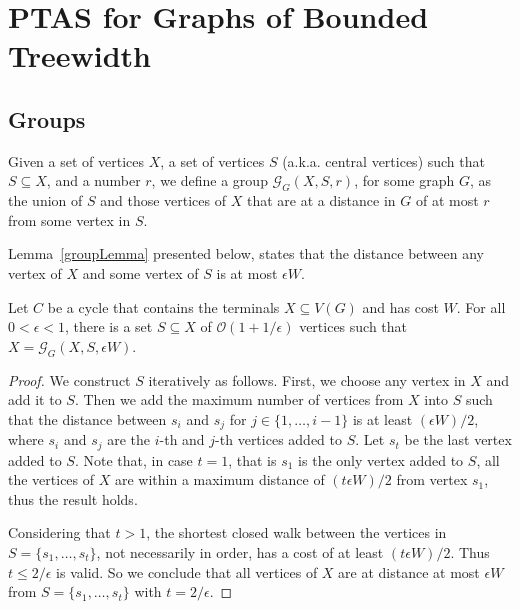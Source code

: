 \section{PTAS for Graphs of Bounded Treewidth}
\label{section:ptas_bounded_tree}

\subsection{Groups}

Given a set of vertices \(X\), a set of vertices \(S\) (a.k.a. central vertices) such that \(S \subseteq X\), and a number \(r\), we define a group \(\mathcal{G}_G(X, S, r)\), for some graph \(G\), as the union of \(S\) and those vertices of \(X\) that are at a distance in \(G\) of at most \(r\) from some vertex in \(S\).

Lemma~\ref{groupLemma} presented below, states that the distance between any vertex of \(X\) and some vertex of \(S\) is at most \(\epsilon W\).

\begin{flemma} \label{groupLemma}
Let \(C\) be a cycle that contains the terminals \(X \subseteq V(G)\) and has cost \(W\). For all \(0 < \epsilon < 1\), there is a set \(S \subseteq X\) of \(\mathcal{O}(1 + 1/\epsilon)\) vertices such that \(X = \mathcal{G}_G(X, S, \epsilon W)\).
\end{flemma}
\begin{proof}

We construct \(S\) iteratively as follows. 
First, we choose any vertex in \(X\) and add it to \(S\). Then we add the maximum number of vertices from \(X\) into \(S\) such that the distance between \(s_i\) and \(s_j\) for \(j \in \{1, \dots, i-1\}\) is at least \((\epsilon W)/2\), where $s_i$ and $s_j$ are the $i$-th and $j$-th vertices added to $S$. Let \(s_t\) be the last vertex added to \(S\). Note that, in case \(t = 1\), that is \(s_1\) is the only vertex added to \(S\), all the vertices of \(X\) are within a maximum distance of \((t \epsilon W)/2\) from vertex \(s_1\), thus the result holds.

Considering that \(t > 1\), the shortest closed walk between the vertices in \(S = \{s_1, \dots, s_t\}\), not necessarily in order, has a cost of at least \((t \epsilon W)/2\). Thus \(t \leq 2/\epsilon\) is valid. So we conclude that all vertices of \(X\) are at distance at most \(\epsilon W\) from \(S = \{s_1, \dots, s_t\}\) with \(t = 2/\epsilon\).
\end{proof}

